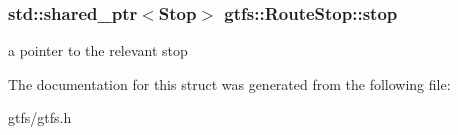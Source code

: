 \subsubsection[{\texorpdfstring{stop}{stop}}]{\setlength{\rightskip}{0pt plus 5cm}std\+::shared\+\_\+ptr$<${\bf Stop}$>$ gtfs\+::\+Route\+Stop\+::stop}\hypertarget{structgtfs_1_1RouteStop_af70ced2604121bbeb159da66bbd00c64}{}\label{structgtfs_1_1RouteStop_af70ced2604121bbeb159da66bbd00c64}
a pointer to the relevant stop 

The documentation for this struct was generated from the following file\+:\begin{DoxyCompactItemize}
\item 
gtfs/gtfs.\+h\end{DoxyCompactItemize}
